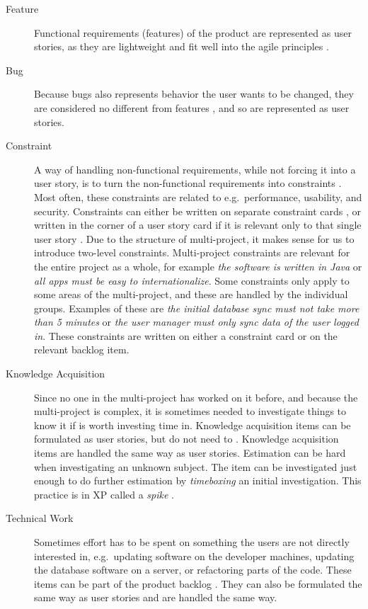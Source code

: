 \begin{description}
  \item[Feature] Functional requirements (features) of the product are represented as user stories, as they are lightweight and fit well into the agile principles \parencite{rubin2012essential}.
  \item[Bug] Because bugs also represents behavior the user wants to be changed, they are considered no different from features \parencite{product-backlog2015}, and so are represented as user stories.
  \item[Constraint] A way of handling non-functional requirements, while not forcing it into a user story, is to turn the non-functional requirements into constraints \parencite[ch.16]{cohn2004}. Most often, these constraints are related to e.g.\ performance, usability, and security. Constraints can either be written on separate constraint cards \parencite[ch.16]{cohn2004}, or written in the corner of a user story card if it is relevant only to that single user story \parencite[ch.7]{cohn2004}. Due to the structure of multi-project, it makes sense for us to introduce two-level constraints. Multi-project constraints are relevant for the entire project as a whole, for example \emph{the software is written in Java} or \emph{all apps must be easy to internationalize}. Some constraints only apply to some areas of the multi-project, and these are handled by the individual groups. Examples of these are \emph{the initial database sync must not take more than 5 minutes} or \emph{the user manager must only sync data of the user logged in}. These constraints are written on either a constraint card or on the relevant backlog item.
  \item[Knowledge Acquisition] Since no one in the multi-project has worked on it before, and because the multi-project is complex, it is sometimes needed to investigate things to know it if is worth investing time in. Knowledge acquisition items can be formulated as user stories, but do not need to \cite{rubin2012essential}. Knowledge acquisition items are handled the same way as user stories. Estimation can be hard when investigating an unknown subject. The item can be investigated just enough to do further estimation by \emph{timeboxing} an initial investigation. This practice is in XP called a \emph{spike} \cite{cohn2004}.
  \item[Technical Work] Sometimes effort has to be spent on something the users are not directly interested in, e.g.\ updating software on the developer machines, updating the database software on a server, or refactoring parts of the code. These items can be part of the product backlog \cite{cohn2004}. They can also be formulated the same way as user stories \cite{rubin2012essential} and are handled the same way.
\end{description}

